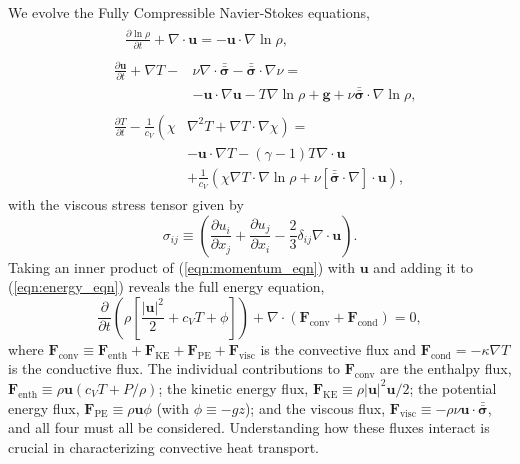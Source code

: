 \documentclass[aps, prl, twocolumn, nofootinbib, groupedaddress, amsfonts, amssymb, amsmath]{revtex4-1}
\newcommand{\Div}[1]{\ensuremath{\nabla\cdot\left( #1\right)}}
\newcommand{\grad}{\ensuremath{\nabla}}
\newcommand{\lilstressT}{\ensuremath{\bm{\bar{\bar{\sigma}}}}}
\begin{document}
We evolve the Fully Compressible Navier-Stokes equations,
\begin{align}
&\begin{aligned}
&\frac{\partial \ln\rho}{\partial t} + \grad\cdot\bm{u} 
    = -\bm{u}\cdot\grad\ln\rho,
	\label{eqn:continuity_eqn}
\end{aligned}\\
&\begin{aligned}
\frac{\partial\bm{u}}{\partial t} + \grad T - 
&\nu\grad\cdot\lilstressT - \lilstressT\cdot\grad\nu = \\
&-\bm{u}\cdot\grad\bm{u} - T\grad\ln\rho + \bm{g} + 
\nu\lilstressT\cdot\grad\ln\rho,
\label{eqn:momentum_eqn}
\end{aligned}\\
&\begin{aligned}
\frac{\partial T}{\partial t} -\frac{1}{c_V}\left(\right.\chi&\left.
    \grad^2 T + \grad T\cdot\grad\chi\right) = \\
	&-\bm{u}\cdot\grad T - (\gamma-1)T\grad\cdot{\bm{u}} \\
	&+ \frac{1}{c_V}\left(\chi\grad T \cdot\grad\ln\rho +
	\nu\left[\lilstressT\cdot\nabla\right]\cdot\bm{u}\right), 
	\label{eqn:energy_eqn}
\end{aligned}
\end{align}
with the viscous stress tensor given by
\begin{equation}
\sigma_{ij} \equiv \left(\frac{\partial u_i}{\partial x_j} + 
\frac{\partial u_j}{\partial x_i} - \frac{2}{3}\delta_{ij}\grad\cdot\bm{u}\right).
	\label{eqn:stress_tensor}
\end{equation}
Taking an inner product of
(\ref{eqn:momentum_eqn}) with $\bm{u}$ and adding it to 
(\ref{eqn:energy_eqn}) reveals the full energy equation,
\begin{equation}
\frac{\partial}{\partial t}\left(\rho\left[\frac{|\bm{u}|^2}{2} + c_V T + \phi\right]\right) +
\Div{\bm{F}_{\text{conv}} + \bm{F}_{\text{cond}}} = 0,
	\label{eqn:energy_eqn_full}
\end{equation}
where
$
\bm{F}_{\text{conv}} \equiv \bm{F}_{\text{enth}} + \bm{F}_{\text{KE}} + \bm{F}_{\text{PE}} + \bm{F}_{\text{visc}}
$
is the convective flux and $\bm{F}_{\text{cond}} = -\kappa \grad T$
is the conductive flux.
The individual contributions to $\bm{F}_{\text{conv}}$ are the enthalpy flux, 
$\bm{F}_{\text{enth}} \equiv \rho\bm{u}(c_V T + P/\rho)$;
the kinetic energy flux, 
$\bm{F}_{\text{KE}} \equiv \rho|\bm{u}|^2\bm{u}/2$;
the potential energy flux,
$\bm{F}_{\text{PE}} \equiv \rho\bm{u}\phi$ (with $\phi \equiv -gz$);
and the viscous flux, 
$\bm{F}_{\text{visc}} \equiv -\rho\nu\bm{u}\cdot\lilstressT$, and all four
must all be considered. 
Understanding how these fluxes interact  
is crucial in characterizing convective heat transport.
\end{document}

